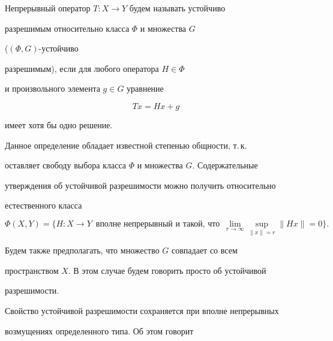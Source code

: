 \begin{defn}


Непрерывный оператор $T:X\to Y$ будем называть устойчиво


разрешимым относительно класса $\Phi$ и множества $G$


($(\Phi ,G)$-устойчиво


разрешимым), если для любого оператора $ H\in \Phi$


и произвольного элемента $g\in G$ уравнение


$$


Tx=Hx+g


$$


имеет хотя бы одно решение.


\end{defn}





Данное определение обладает известной степенью общности, т.\,к. 


оставляет свободу выбора класса $\Phi$ и множества $G$. Содержательные 


утверждения об устойчивой разрешимости можно получить относительно 


естественного класса


$$


\Phi \left( X,Y\right) =\{H:X\to Y\ \;


\text{вполне непрерывный и такой, что}\ \;


\lim_{r\to \infty} \sup_{\| x \|=r} \| Hx\|=0\}.


$$





Будем также предполагать, что множество $G$ совпадает со всем 


пространством $X$. В этом случае будем говорить просто об устойчивой 


разрешимости.


Свойство устойчивой разрешимости сохраняется при вполне непрерывных 


возмущениях определенного типа. Об этом говорит





